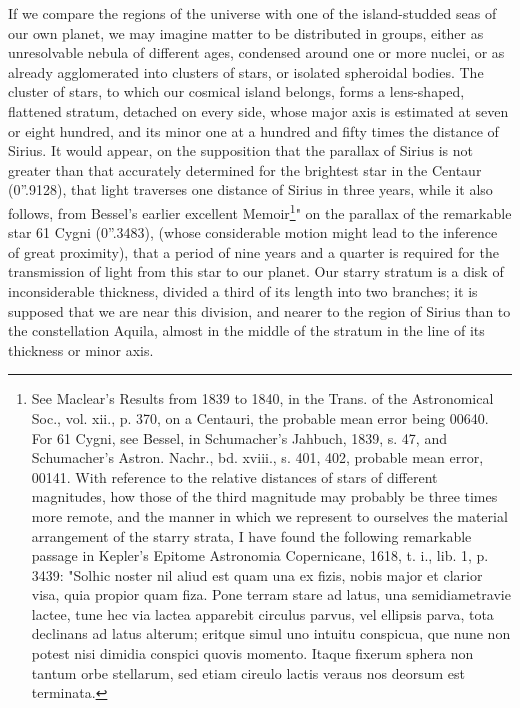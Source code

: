 If we compare the regions of the universe with one of the island-studded seas of our own planet, we may imagine matter to be distributed in groups, either as unresolvable nebula of different ages, condensed around one or more nuclei, or as already agglomerated into clusters of stars, or isolated spheroidal bodies. The cluster of stars, to which our cosmical island belongs, forms a lens-shaped, flattened stratum, detached on every side, whose major axis is estimated at seven or eight hundred, and its minor one at a hundred and fifty times the distance of Sirius. It would appear, on the supposition that the parallax of Sirius is not greater than that accurately determined for the brightest star in the Centaur (0''.9128), that light traverses one distance of Sirius in three years, while it also follows, from Bessel's earlier excellent Memoir\footnote{See Maclear's Results from 1839 to 1840, in the Trans. of the Astronomical Soc., vol. xii., p. 370, on a Centauri, the probable mean error being 00640. For 61 Cygni, see Bessel, in Schumacher's Jahbuch, 1839, s. 47, and Schumacher's Astron. Nachr., bd. xviii., s. 401, 402, probable mean error, 00141. With reference to the relative distances of stars of different magnitudes, how those of the third magnitude may probably be three times more remote, and the manner in which we represent to ourselves the material arrangement of the starry strata, I have found the following remarkable passage in Kepler's Epitome Astronomia Copernicane, 1618, t. i., lib. 1, p. 3439: "Solhic noster nil aliud est quam una ex fizis, nobis major et clarior visa, quia propior quam fiza. Pone terram stare ad latus, una semidiametravie lactee, tune hec via lactea apparebit circulus parvus, vel ellipsis parva, tota declinans ad latus alterum; eritque simul uno intuitu conspicua, que nune non potest nisi dimidia conspici quovis momento. Itaque fixerum sphera non tantum orbe stellarum, sed etiam cireulo lactis veraus nos deorsum est terminata.}" on the parallax of the remarkable star 61 Cygni (0''.3483), (whose considerable motion might lead to the inference of great proximity), that a period of nine years and a quarter is required for the transmission of light from this star to our planet. Our starry stratum is a disk of inconsiderable thickness, divided a third of its length into two branches; it is supposed that we are near this division, and nearer to the region of Sirius than to the constellation Aquila, almost in the middle of the stratum in the line of its thickness or minor axis.